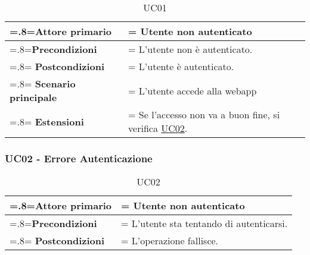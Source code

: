             \begin{table}[H]
                \centering
                \renewcommand{\arraystretch}{1.8}
                \renewcommand\tabularxcolumn[1]{m{#1}}
                \begin{tabularx}{0.9\textwidth} {
                    >{\hsize=.8\hsize\linewidth=\hsize}X
                    >{\hsize=1.2\hsize\linewidth=\hsize}X}
                    \hline
                    \textbf{Attore primario} & Utente non autenticato \\
                    \hline
                    \textbf{Precondizioni} & L'utente non è autenticato. \\
                    \hline
                    \textbf{Postcondizioni} & L'utente è autenticato. \\
                    \hline
                    \textbf{Scenario principale} & L'utente accede alla webapp \\
                    \hline
                    \textbf{Estensioni} & Se l'accesso non va a buon fine, si verifica \hyperref[UC02]{UC02}. \\
                    \hline
                \end{tabularx}
                \caption{UC01}
            \end{table}

\subsubsection{UC02 - Errore Autenticazione}

                    \begin{table}[H]
                    \centering
                    \renewcommand{\arraystretch}{1.8}
                    \renewcommand\tabularxcolumn[1]{m{#1}}
                    \begin{tabularx}{0.9\textwidth} {
                        >{\hsize=.8\hsize\linewidth=\hsize}X
                        >{\hsize=1.2\hsize\linewidth=\hsize}X}
                        \hline
                        \textbf{Attore primario} & Utente non autenticato \\
                        \hline
                        \textbf{Precondizioni} & L'utente sta tentando di autenticarsi. \\
                        \hline
                        \textbf{Postcondizioni} & L'operazione fallisce. \\
                        \hline
                        
                    \end{tabularx}
                    \caption{UC02}
                \end{table}

